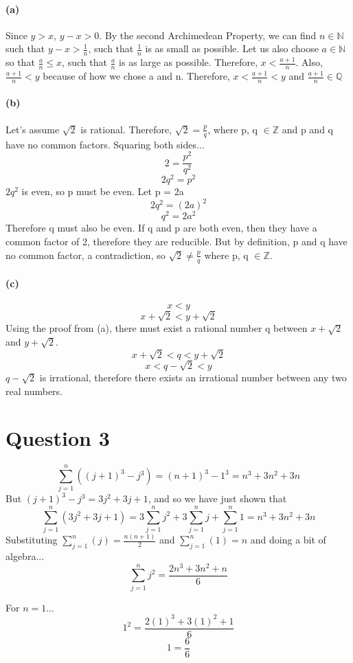 \documentclass[10pt,letter]{article}
\begin{document}
\paragraph{(a)} 
Since $y>x$, $y-x > 0$. By the second Archimedean Property, we can find $n \in \mathbb{N}$ such that $y-x > \frac{1}{n}$, such that $\frac{1}{n}$ is as small as possible. Let us also choose $a \in \mathbb{N}$ so that $\frac{a}{n} \leq x$, such that $\frac{a}{n}$ is as large as possible. Therefore, $x < \frac{a+1}{n}$. Also, $\frac{a+1}{n} < y$ because of how we chose a and n. Therefore, $x < \frac{a+1}{n} < y$ and $\frac{a+1}{n} \in \mathbb{Q}$

\paragraph{(b)} 
Let's assume $\sqrt{2}$ is rational. Therefore, $\sqrt{2} = \frac{p}{q}$, where p, q $\in \mathbb{Z}$ and p and q have no common factors. Squaring both sides... 
$$2 = \frac{p^2}{q^2}$$ 
$$2q^2 = p^2$$
$2q^2$ is even, so p must be even. Let p = 2a $$2q^2 = (2a)^2$$ $$q^2 = 2a^2$$
Therefore q must also be even. If q and p are both even, then they have a common factor of 2, therefore they are reducible. But by definition, p and q have no common factor, a contradiction, so $\sqrt{2} \neq \frac{p}{q}$ where p, q $\in \mathbb{Z}$.

\paragraph{(c)}
$$ x < y$$
$$ x + \sqrt{2} < y + \sqrt{2}$$ 
Using the proof from (a), there must exist a rational number q between $x + \sqrt{2}$ and $y + \sqrt{2}$.
$$ x + \sqrt{2} < q < y + \sqrt{2}$$
$$ x < q - \sqrt{2} < y$$
$q - \sqrt{2}$ is irrational, therefore there exists an irrational number between any two real numbers.

\section*{Question 3}
$$\sum_{j=1}^{n}((j+1)^3 - j^3) = (n+1)^3 - 1^3 = n^3 + 3n^2 + 3n$$
But $(j+1)^3 - j^3 = 3j^2 + 3j + 1$, and so we have just shown that 
$$\sum_{j=1}^{n}(3j^2 + 3j + 1) = 3\sum_{j=1}^{n}j^2 + 3\sum_{j=1}^{n}j + \sum_{j=1}^{n}1 = n^3 + 3n^2 + 3n$$
Substituting $\sum_{j=1}^{n}(j) = \frac{n(n+1)}{2}$ and $\sum_{j=1}^{n}(1) = n$ and doing a bit of algebra...
$$\sum_{j=1}^{n}j^2 =  \frac{2n^3 + 3n^2 + n}{6}$$

For $n = 1$...
$$1^2 = \frac{2(1)^3 + 3(1)^2 + 1}{6}$$
$$1 = \frac{6}{6}$$
\end{document}
